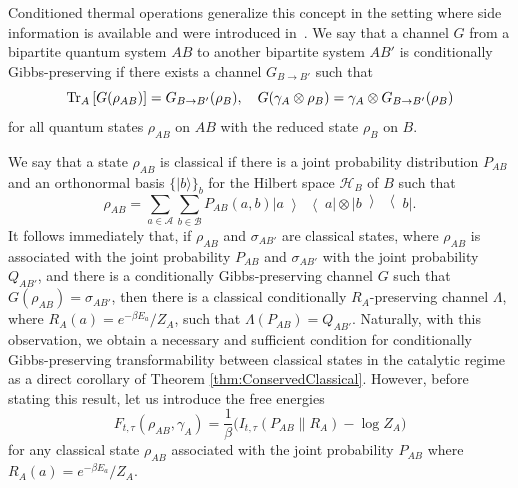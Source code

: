 \documentclass[aps,pra,11pt,onecolumn,nofootinbib,tightenlines]{revtex4-2}
\theoremstyle{definition}
\newcommand{\mc}[1]{\mathcal{#1}}
\newcommand{\ketbra}[2]{\left|#1\middle\rangle\middle\langle #2\right|}
\newcommand{\ptr}[2]{{\rm Tr}_{#1}\left[#2\right]}
\begin{document}
Conditioned thermal operations generalize this concept in the setting where side information is available and were introduced in~\cite{narasimhachar2017resource}. We say that a channel $G$ from a bipartite quantum system $AB$ to another bipartite system $AB'$ is conditionally Gibbs-preserving if there exists a channel $G_{B\to B'}$ such that
\begin{equation}
\ptr{A}{G(\rho_{AB})}=G_{B\to B'}(\rho_B),\quad G(\gamma_A\otimes\rho_B)=\gamma_A\otimes G_{B\to B'}(\rho_B)
\end{equation}
for all quantum states $\rho_{AB}$ on $AB$ with the reduced state $\rho_B$ on $B$.

We say that a state $\rho_{AB}$ is classical if there is a joint probability distribution $P_{AB}$ and an orthonormal basis $\{|b\rangle\}_b$ for the Hilbert space $\mc H_B$ of $B$ such that
\begin{equation}
\rho_{AB}=\sum_{a\in\mc A}\sum_{b\in\mc B}P_{AB}(a,b)\ketbra{a}{a}\otimes\ketbra{b}{b}.
\end{equation}
It follows immediately that, if $\rho_{AB}$ and $\sigma_{AB'}$ are classical states, where $\rho_{AB}$ is associated with the joint probability $P_{AB}$ and $\sigma_{AB'}$ with the joint probability $Q_{AB'}$, and there is a conditionally Gibbs-preserving channel $G$ such that $G(\rho_{AB})=\sigma_{AB'}$, then there is a classical conditionally $R_A$-preserving channel $\Lambda$, where $R_A(a)=e^{-\beta E_a}/Z_A$, such that $\Lambda(P_{AB})=Q_{AB'}$. Naturally, with this observation, we obtain a necessary and sufficient condition for conditionally Gibbs-preserving transformability between classical states in the catalytic regime as a direct corollary of Theorem \ref{thm:ConservedClassical}. However, before stating this result, let us introduce the free energies
\begin{equation}
F_{t,\tau}(\rho_{AB},\gamma_A)=\frac{1}{\beta}\big(I_{t,\tau}(P_{AB}\|R_A)-\log{Z_A}\big)
\end{equation}
for any classical state $\rho_{AB}$ associated with the joint probability $P_{AB}$ where $R_A(a)=e^{-\beta E_a}/Z_A$. 
\end{document}
